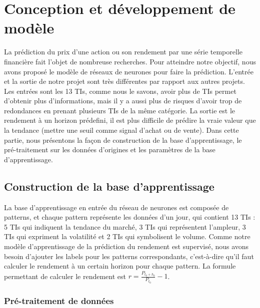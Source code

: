 

\section{Conception et développement de modèle}

La prédiction du prix d'une action ou son rendement par une série temporelle financière fait l'objet de nombreuse recherches. Pour atteindre notre objectif, nous avons proposé le modèle de réseaux de neurones pour faire la prédiction. L’entrée et la sortie de notre projet sont très différentes par rapport aux autres projets. Les entrées sont les 13 TIs, comme nous le savons, avoir plus de TIs permet d'obtenir plus d’informations, mais il y a aussi plus de risques d’avoir trop de redondances en prenant plusieurs TIs de la même catégorie. La sortie est le rendement à un horizon prédefini, il est plus difficile de prédire la vraie valeur que la tendance (mettre une seuil comme signal d’achat ou de vente). Dans cette partie, nous présentons la façon de construction de la base d'apprentissage, le pré-traitement sur les données d'origines et les paramètres de la base d'apprentissage. 

\subsection{Construction de la base d’apprentissage}

La base d'apprentissage en entrée du réseau de neurones est composée de patterns, et chaque pattern représente les données d'un jour, qui contient 13 TIs : 5 TIs qui indiquent la tendance du marché, 3 TIs qui représentent l'ampleur, 3 TIs qui expriment la volatilité et 2 TIs qui symbolisent le volume. Comme notre modèle d'apprentissage de la prédiction du rendement est supervisé, nous avons besoin d’ajouter les labels pour les patterns correspondants, c’est-à-dire qu'il faut calculer le rendement à un certain horizon pour chaque pattern. La formule permettant de calculer le rendement est $ r = \frac{P_{t_{0}+h_{0}}}{P_{t_{0}}} - 1 $.


\subsubsection{Pré-traitement de données}

